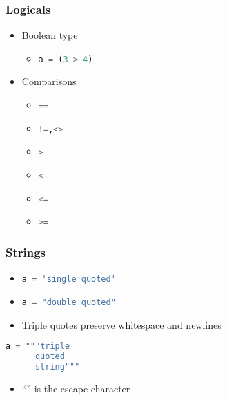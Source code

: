 \documentclass[xcolor=table,10pt,final]{beamer}
\begin{document}
\begin{frame}
  \frametitle{Logicals}
  \begin{itemize}
    \item Boolean type
      \begin{itemize}
        \item \lstinline[language=Python]|a = (3 > 4)|
      \end{itemize}
    \item Comparisons
      \begin{itemize}
        \item \lstinline[language=Python]|==|
        \item \lstinline[language=Python]|!=,<>|
        \item \lstinline[language=Python]|>|
        \item \lstinline[language=Python]|<|
        \item \lstinline[language=Python]|<=|
        \item \lstinline[language=Python]|>=|
      \end{itemize}
  \end{itemize}
\end{frame}



\begin{frame}[fragile]
  \frametitle{Strings}
  \begin{itemize}
    \item \lstinline[language=Python]|a = 'single quoted'|
    \item \lstinline[language=Python]|a = "double quoted"|
    \item Triple quotes preserve whitespace and newlines
  \end{itemize}
      \begin{lstlisting}[language=Python]
      a = """triple
      quoted
      string"""
      \end{lstlisting}
      \begin{itemize}
    \item ``'' is the escape character
  \end{itemize}
\end{frame}
\end{document}

